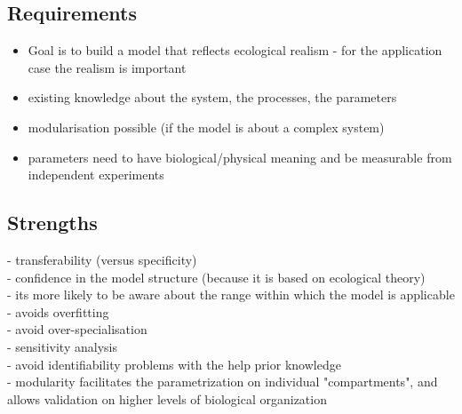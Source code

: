 \documentclass [english,11pt]{article} %
\begin{document}
\subsection*{Requirements}
\begin{itemize}
\item Goal is to build a model that reflects ecological realism - for the application case the realism is important
\item existing knowledge about the system, the processes, the parameters
\item modularisation possible (if the model is about a complex system)
\item parameters need to have biological/physical meaning and be measurable from independent experiments
\end{itemize}

\subsection*{Strengths}
- transferability (versus specificity) \\
- confidence in the model structure (because it is based on ecological theory)\\
- its more likely to be aware about the range within which the model is applicable\\
- avoids overfitting\\
- avoid over-specialisation\\
- sensitivity analysis\\
- avoid identifiability problems with the help prior knowledge\\
- modularity facilitates the parametrization on individual "compartments", and allows validation on higher levels of biological organization\\
\end{document}
